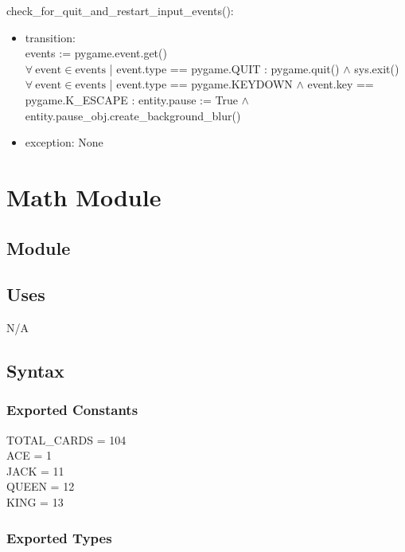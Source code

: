 \documentclass[12pt]{article}
\begin{document}
check\_for\_quit\_and\_restart\_input\_events():
\begin{itemize}
    \item transition: \\ events := pygame.event.get()\\
    $\forall\ \text{event} \in \text{events}$ | event.type == pygame.QUIT : pygame.quit() $\land$ sys.exit()\\
    
    $\forall\ \text{event} \in \text{events}$ | event.type == pygame.KEYDOWN $\land$ event.key == pygame.K\_ESCAPE : entity.pause := True $\land$ entity.pause\_obj.create\_background\_blur()
    \item exception: None
\end{itemize}

\newpage


\newpage

\section* {Math Module}

\subsection*{Module}

\subsection* {Uses}

N/A

\subsection* {Syntax}

\subsubsection* {Exported Constants}



TOTAL\_CARDS = 104\\
ACE = 1\\
JACK = 11\\
QUEEN = 12\\
KING = 13

\subsubsection* {Exported Types}
\end{document}
